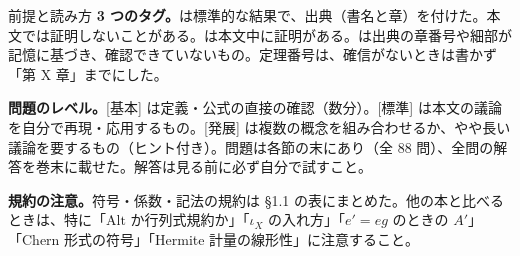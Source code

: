 \begin{keybox}{前提と読み方}
\textbf{3 つのタグ。}\tC は標準的な結果で、出典（書名と章）を付けた。本文では証明しないことがある。\tP は本文中に証明がある。\tQ は出典の章番号や細部が記憶に基づき、確認できていないもの。定理番号は、確信がないときは書かず「第 X 章」までにした。

\textbf{問題のレベル。}\textcolor{red!60!black}{[基本]} は定義・公式の直接の確認（数分）。\textcolor{red!60!black}{[標準]} は本文の議論を自分で再現・応用するもの。\textcolor{red!60!black}{[発展]} は複数の概念を組み合わせるか、やや長い議論を要するもの（ヒント付き）。問題は各節の末にあり（全 88 問）、全問の解答を巻末に載せた。解答は見る前に必ず自分で試すこと。

\textbf{規約の注意。}符号・係数・記法の規約は §1.1 の表にまとめた。他の本と比べるときは、特に「$\mathrm{Alt}$ か行列式規約か」「$\iota_X$ の入れ方」「$e'=eg$ のときの $A'$」「Chern 形式の符号」「Hermite 計量の線形性」に注意すること。
\end{keybox}

{\setcounter{tocdepth}{2}
\tableofcontents}
\clearpage
